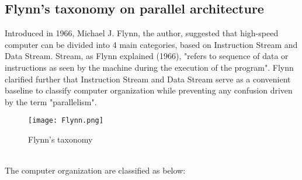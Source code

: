 \subsection{Flynn's taxonomy on parallel architecture}

Introduced in 1966, Michael J. Flynn, the author, suggested that high-speed computer can be divided into 4 main categories, based on Instruction Stream and Data Stream. Stream, as Flynn explained (1966), "refers to sequence of data or instructions as seen by the machine during the execution of the program". Flynn clarified further that Instruction Stream and Data Stream serve as a convenient baseline to classify computer organization while preventing any confusion driven by the term "parallelism". \\
\begin{figure}[H]
\texttt{[image: Flynn.png]}
\centering
\caption{Flynn's taxonomy}
\end{figure}
~\\
The computer organization are classified as below:
